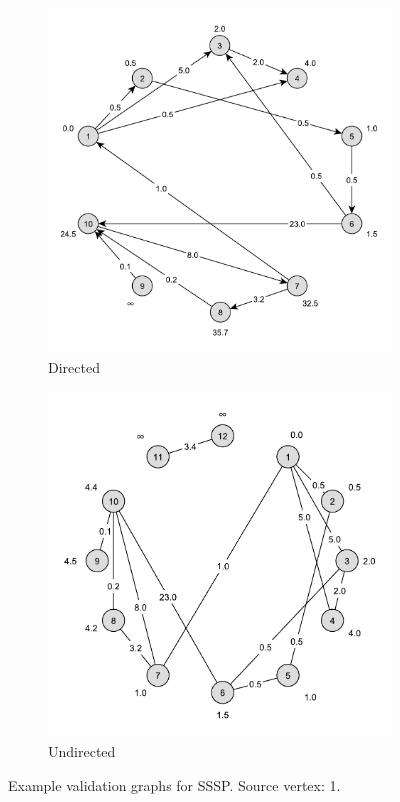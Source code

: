 \begin{figure}[h]
	\centering
	\begin{subfigure}{0.496\textwidth}
		\centering
		\includegraphics[scale=\examplescale]{figures/examples/sssp-dir.pdf}
		\caption{Directed}
	\end{subfigure}
	\begin{subfigure}{0.496\textwidth}
		\centering
		\includegraphics[scale=\examplescale]{figures/examples/sssp-undir.pdf}
		\caption{Undirected}
	\end{subfigure}
	\caption{Example validation graphs for SSSP. Source vertex: 1.}
	\label{fig:sssp_example}
\end{figure}

